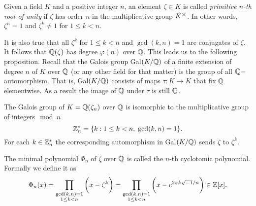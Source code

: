 \begin{definition}\label{r-of-1}
    Given a field $K$ and a positive integer $n$, an element $\zeta \in K$ is called \textit{primitive $n$-th root of unity} if $\zeta$ has order $n$ in the multiplicative group $K^{\cross}$. In other words, $\zeta^n = 1$ and $\zeta^k \neq 1$ for $1 \leq k < n$. 
\end{definition}
It is also true that all $\zeta^k$ for $1 \leq k < n$ and $\gcd(k,n) = 1$ are conjugates of $\zeta$. It follows that $\mathbb{Q}(\zeta)$ has degree $\varphi(n)$ over $\mathbb{Q}$. This leads us to the following proposition. Recall that the Galois group Gal$(K/\mathbb{Q})$ of a finite extension of degree $n$ of $K$ over $\mathbb{Q}$ (or any other field for that matter) is the group of all $\mathbb{Q}-$automorphism. That is, Gal$(K/\mathbb{Q})$ consists of maps $\tau : K \rightarrow K$ that fix $\mathbb{Q}$ elementwise. As a result the image of $\mathbb{Q}$ under $\tau$ is still $\mathbb{Q}$. 
\begin{proposition}\label{galois}
	The Galois group of $K = \mathbb{Q}(\zeta_n)$ over $\mathbb{Q}$ is isomorphic to the multiplicative group of integers$\mod n$
	\[ \mathbb{Z}_n^* = \{ k : 1 \leq k < n, \; \gcd(k,n) = 1 \}. \]
	For each $k \in \mathbb{Z}_n^*$ the corresponding automorphism in Gal$(K/\mathbb{Q})$ sends $\zeta$ to $\zeta^k$.
\end{proposition}

The minimal polynomial $\Phi_n$ of $\zeta$ over $\mathbb{Q}$ is called the $n$-th cyclotomic polynomial. Formally we define it as 
\[ \Phi_n(x) = \prod_{\substack{\gcd(k,n) = 1 \\ 1 \leq k < n}} \bigg( x - \zeta^k \bigg) = \prod_{\substack{\gcd(k,n) = 1 \\ 1 \leq k < n}} \bigg( x - e^{2\pi k \sqrt{-1}/n} \bigg) \in \mathbb{Z}[x]. \]

